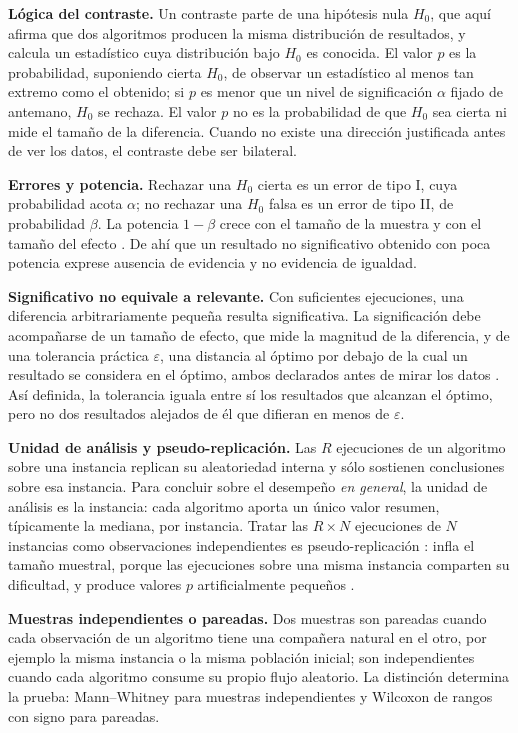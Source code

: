 \textbf{Lógica del contraste.} Un contraste parte de una hipótesis nula $H_0$, que aquí afirma que dos algoritmos producen la misma distribución de resultados, y calcula un estadístico cuya distribución bajo $H_0$ es conocida. El valor $p$ es la probabilidad, suponiendo cierta $H_0$, de observar un estadístico al menos tan extremo como el obtenido; si $p$ es menor que un nivel de significación $\alpha$ fijado de antemano, $H_0$ se rechaza. El valor $p$ no es la probabilidad de que $H_0$ sea cierta ni mide el tamaño de la diferencia. Cuando no existe una dirección justificada antes de ver los datos, el contraste debe ser bilateral.

\textbf{Errores y potencia.} Rechazar una $H_0$ cierta es un error de tipo I, cuya probabilidad acota $\alpha$; no rechazar una $H_0$ falsa es un error de tipo II, de probabilidad $\beta$. La potencia $1-\beta$ crece con el tamaño de la muestra y con el tamaño del efecto \cite{Cohen1988Power}. De ahí que un resultado no significativo obtenido con poca potencia exprese ausencia de evidencia y no evidencia de igualdad.

\textbf{Significativo no equivale a relevante.} Con suficientes ejecuciones, una diferencia arbitrariamente pequeña resulta significativa. La significación debe acompañarse de un tamaño de efecto, que mide la magnitud de la diferencia, y de una tolerancia práctica $\varepsilon$, una distancia al óptimo por debajo de la cual un resultado se considera en el óptimo, ambos declarados antes de mirar los datos \cite{Arcuri2014Hitchhiker}. Así definida, la tolerancia iguala entre sí los resultados que alcanzan el óptimo, pero no dos resultados alejados de él que difieran en menos de $\varepsilon$.

\textbf{Unidad de análisis y pseudo-replicación.} Las $R$ ejecuciones de un algoritmo sobre una instancia replican su aleatoriedad interna y sólo sostienen conclusiones sobre esa instancia. Para concluir sobre el desempeño \emph{en general}, la unidad de análisis es la instancia: cada algoritmo aporta un único valor resumen, típicamente la mediana, por instancia. Tratar las $R\times N$ ejecuciones de $N$ instancias como observaciones independientes es pseudo-replicación \cite{Hurlbert1984Pseudoreplication}: infla el tamaño muestral, porque las ejecuciones sobre una misma instancia comparten su dificultad, y produce valores $p$ artificialmente pequeños \cite{Demsar2006Statistical}.

\textbf{Muestras independientes o pareadas.} Dos muestras son pareadas cuando cada observación de un algoritmo tiene una compañera natural en el otro, por ejemplo la misma instancia o la misma población inicial; son independientes cuando cada algoritmo consume su propio flujo aleatorio. La distinción determina la prueba: Mann--Whitney para muestras independientes y Wilcoxon de rangos con signo para pareadas.

